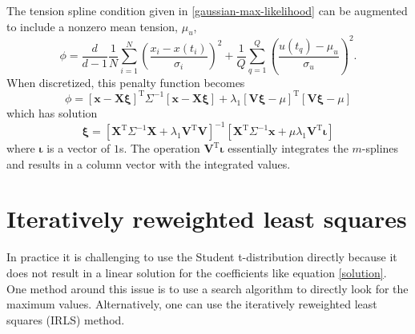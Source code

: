 \documentclass[10pt,journal]{IEEEtran}
\begin{document}
The tension spline condition given in \ref{gaussian-max-likelihood} can be augmented to include a nonzero mean tension, $\mu_u$,
\begin{equation}
\phi =  \frac{d}{d-1} \frac{1}{N} \sum^N _{i=1}\left( \frac{x_i - x(t_i)}{\sigma_i} \right)^2 + \frac{1}{Q} \sum^{Q}_{q=1}  \left(  \frac{u(t_q)-\mu_u}{\sigma_u} \right)^2.
\end{equation}
When discretized, this penalty function becomes
\begin{equation}
\phi = \left[ \mathbf{x} - \mathbf{X} \mathbf{\xi} \right]^{\textrm{T}} \Sigma^{-1} \left[ \mathbf{x} - \mathbf{X} \mathbf{\xi}\right]
+ \lambda_1 \left[\mathbf{V}\mathbf{\xi} - \mu \right]^{\textrm{T}} \left[ \mathbf{V}\mathbf{\xi} - \mu \right]
\end{equation}
which has solution
\begin{equation}
\mathbf{\xi} = \left[ \mathbf{X}^{\textrm{T}} \Sigma^{-1} \mathbf{X} + \lambda_1 \mathbf{V}^{\textrm{T}} \mathbf{V} \right]^{-1}   \left[ \mathbf{X}^{\textrm{T}} \Sigma^{-1} \mathbf{x} +  \mu \lambda_1 \mathbf{V}^{\textrm{T}} \mathbf{\iota} \right]
\end{equation}
where $\mathbf{\iota}$ is a vector of $1$s. The operation $\mathbf{V}^{\textrm{T}} \mathbf{\iota}$ essentially integrates the $m$-splines and results in a column vector with the integrated values.



\section{Iteratively reweighted least squares}
\label{sec:irls}

In practice it is challenging to use the Student t-distribution directly because it does not result in a linear solution for the coefficients like equation \ref{solution}. One method around this issue is to use a search algorithm to directly look for the maximum values. Alternatively, one can use the iteratively reweighted least squares (IRLS) method.
\end{document}
